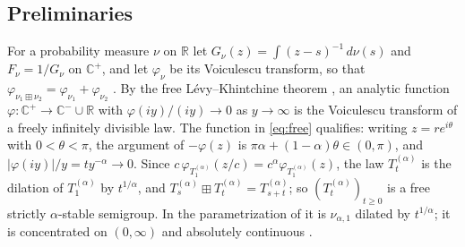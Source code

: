 \documentclass[11pt]{amsart}
\theoremstyle{definition}
\theoremstyle{remark}
\numberwithin{equation}{section}
\newcommand{\R}{\mathbb R}
\newcommand{\C}{\mathbb C}
\newcommand{\bp}{\boxplus}
\begin{document}
\subsection{Preliminaries}
For a probability measure $\nu$ on $\R$ let $G_\nu(z)=\int(z-s)^{-1}\,d\nu(s)$ and $F_\nu=1/G_\nu$ on $\C^+$, and let $\varphi_\nu$ be its Voiculescu transform, so that $\varphi_{\nu_1\bp\nu_2}=\varphi_{\nu_1}+\varphi_{\nu_2}$ \cite{BV}. By the free L\'evy--Khintchine theorem \cite[Section 5]{BV}, an analytic function $\varphi:\C^+\to\C^-\cup\R$ with $\varphi(iy)/(iy)\to0$ as $y\to\infty$ is the Voiculescu transform of a freely infinitely divisible law. The function in \eqref{eq:free} qualifies: writing $z=re^{i\theta}$ with $0<\theta<\pi$, the argument of $-\varphi(z)$ is $\pi\alpha+(1-\alpha)\theta\in(0,\pi)$, and $|\varphi(iy)|/y=ty^{-\alpha}\to0$. Since $c\,\varphi_{T^{(\alpha)}_1}(z/c)=c^{\alpha}\varphi_{T^{(\alpha)}_1}(z)$, the law $T^{(\alpha)}_t$ is the dilation of $T^{(\alpha)}_1$ by $t^{1/\alpha}$, and $T^{(\alpha)}_s\bp T^{(\alpha)}_t=T^{(\alpha)}_{s+t}$; so $(T^{(\alpha)}_t)_{t\ge0}$ is a free strictly $\alpha$-stable semigroup. In the parametrization of \cite{HK} it is $\nu_{\alpha,1}$ dilated by $t^{1/\alpha}$; it is concentrated on $(0,\infty)$ \cite[Corollary 1]{HK} and absolutely continuous \cite{BP}.
\end{document}
